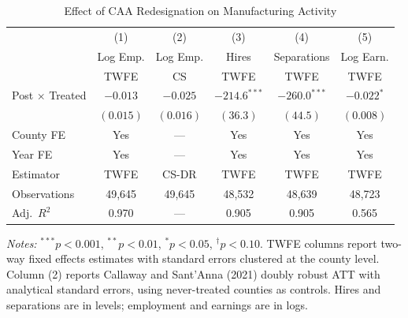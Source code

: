 \begin{table}[t]
\centering
\caption{Effect of CAA Redesignation on Manufacturing Activity}
\label{tab:main}
\begin{tabular}{lccccc}
\toprule
 & (1) & (2) & (3) & (4) & (5) \\
 & Log Emp. & Log Emp. & Hires & Separations & Log Earn. \\
 & TWFE & CS & TWFE & TWFE & TWFE \\
\midrule
Post $\times$ Treated & $-0.013$ & $-0.025$ & $-214.6^{***}$ & $-260.0^{***}$ & $-0.022^{*}$ \\
 & $(0.015)$ & $(0.016)$ & $(36.3)$ & $(44.5)$ & $(0.008)$ \\
\midrule
County FE & Yes & --- & Yes & Yes & Yes \\
Year FE & Yes & --- & Yes & Yes & Yes \\
Estimator & TWFE & CS-DR & TWFE & TWFE & TWFE \\
Observations & 49,645 & 49,645 & 48,532 & 48,639 & 48,723 \\
Adj.\ $R^2$ & 0.970 & --- & 0.905 & 0.905 & 0.565 \\
\bottomrule
\end{tabular}

\vspace{0.3em}
{\small \textit{Notes:} $^{***}p<0.001$, $^{**}p<0.01$, $^{*}p<0.05$, $^{\dagger}p<0.10$. TWFE columns report two-way fixed effects estimates with standard errors clustered at the county level. Column (2) reports Callaway and Sant'Anna (2021) doubly robust ATT with analytical standard errors, using never-treated counties as controls. Hires and separations are in levels; employment and earnings are in logs.}
\end{table}
